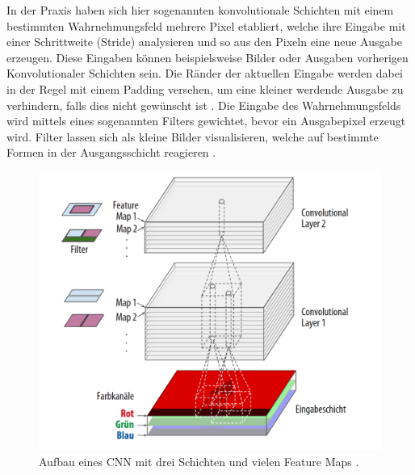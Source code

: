 \documentclass[twoside,a4paper]{IEEEtran}
\begin{document}
In der Praxis haben sich hier sogenannten konvolutionale Schichten mit einem bestimmten Wahrnehmungsfeld mehrere Pixel etabliert, welche  ihre Eingabe mit einer Schrittweite (Stride) analysieren und so aus den Pixeln eine neue Ausgabe erzeugen. Diese Eingaben können beispielsweise Bilder oder Ausgaben vorherigen Konvolutionaler Schichten sein. Die Ränder der aktuellen Eingabe werden dabei in der Regel mit einem Padding versehen, um eine kleiner werdende Ausgabe zu verhindern, falls dies nicht gewünscht ist \cite[S.361-363]{MACHINE_LEARNING}. Die Eingabe des Wahrnehmungsfelds wird mittels eines sogenannten Filters gewichtet, bevor ein Ausgabepixel erzeugt wird. Filter lassen sich als kleine Bilder visualisieren, welche auf bestimmte Formen in der Ausgangsschicht reagieren \cite[S.363]{MACHINE_LEARNING}. 

\begin{figure}[!htb]
	\includegraphics[width=\columnwidth]{cnn_example}
	\caption{Aufbau eines CNN mit drei Schichten und vielen Feature Maps \cite[S.365]{MACHINE_LEARNING}.}
	\label{bild1}
\end{figure}
\end{document}
